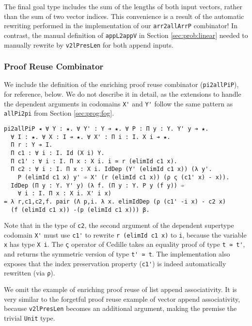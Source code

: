 \documentclass[acmsmall]{acmart}\settopmatter{}
\newcommand{\refsec}[1]{Section \ref{sec:#1}}
\begin{document}
The final goal type includes the sum of the lengths of both input
vectors, rather than the sum of two vector indices.
This convenience is a result
of the automatic rewriting performed in the implementation of our
\verb;arr2allArrP; combinator! In contrast, the manual definition of
\verb;appL2appV; in \refsec{prob:linear} needed to manually rewrite
by \verb;v2lPresLen; for both append inputs.

\subsubsection{Proof Reuse Combinator}

We include the definition of the enriching proof reuse combinator
(\verb;pi2allPiP;), for reference, below.  We do not describe it in
detail, as the extensions to handle the dependent arguments in
codomains \verb;X'; and \verb;Y'; follow the same pattern as
\verb;allPi2pi; from \refsec{prog:fog}.
\begin{verbatim}
pi2allPiP ◂ ∀ Y : ★. ∀ Y' : Y ➔ ★. ∀ P : Π y : Y. Y' y ➔ ★.
  ∀ I : ★. ∀ X : I ➔ ★. ∀ X' : Π i : I. X i ➔ ★.
  Π r : Y ➔ I.
  Π c1 : ∀ i : I. Id (X i) Y.
  Π c1' : ∀ i : I. Π x : X i. i ≃ r (elimId c1 x).
  Π c2 : ∀ i : I. Π x : X i. IdDep (Y' (elimId c1 x)) (λ y'.
    P (elimId c1 x) y' ➾ X' (r (elimId c1 x)) (ρ ς (c1' x) - x)).
  IdDep (Π y : Y. Y' y) (λ f. (Π y : Y. P y (f y)) ➾
    ∀ i : I. Π x : X i. X' i x)
= λ r,c1,c2,f. pair (Λ p,i. λ x. elimIdDep (ρ (c1' -i x) - c2 x)
  (f (elimId c1 x)) -(p (elimId c1 x))) β.
\end{verbatim}
Note that in the type of \verb;c2;, the second argument of the
dependent supertype codomain \verb;X'; must use \verb;c1'; to rewrite
\verb;r (elimId c1 x); to \verb;i;, because the variable \verb;x; has
type \verb;X i;. The \verb;ς; operator of Cedille takes an equality
proof of type \verb;t ≃ t';, and returns the symmetric version of type
\verb;t' ≃ t;. The implementation also exposes that the index preservation
property (\verb;c1';) is indeed automatically rewritten
(via \verb;ρ;).

We omit the example of enriching proof reuse of list append
associativity. It is very similar to the forgetful proof reuse example
of vector append associativity, because \verb;v2lPresLen; becomes an
additional argument, making the premise the trivial \verb;Unit; type.
\end{document}

